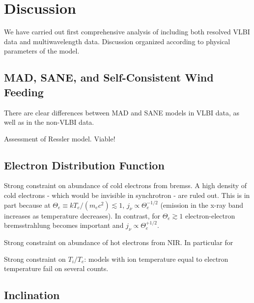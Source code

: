 \section{Discussion}\label{sec:discussions}

We have carried out first comprehensive analysis of \sgra including both resolved VLBI data and multiwavelength data.
Discussion organized according to physical parameters of the model.

\subsection{MAD, SANE, and Self-Consistent Wind Feeding}


There are clear differences between MAD and SANE models in VLBI data, as well as in the non-VLBI data.

Assessment of Ressler model.  Viable!

\subsection{Electron Distribution Function}


Strong constraint on abundance of cold electrons from bremss.  A high density of cold electrons - which would be invisible in synchrotron - are ruled out.  This is in part because at $\Theta_e \equiv k T_e/(m_e c^2) \lesssim 1$, $j_\nu \propto \Theta_e^{-1/2}$ (emission in the x-ray band increases as temperature decreases).  In contrast, for $\Theta_e \gtrsim 1$ electron-electron bremsstrahlung becomes important and $j_\nu \propto \Theta_e^{+1/2}$.

Strong constraint on abundance of hot electrons from NIR.  In particular for

Strong constraint on $T_i/T_e$: models with ion temperature equal to electron temperature fail on several counts.

\subsection{Inclination}


